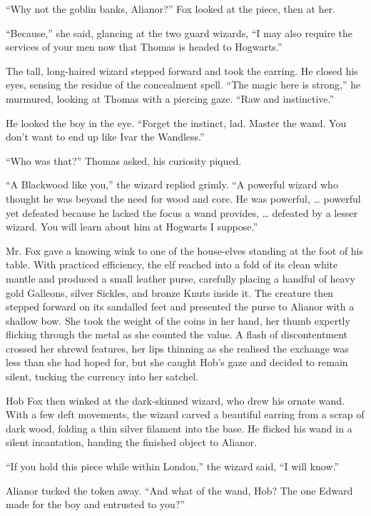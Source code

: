 \enquote{Why not the goblin banks, Alianor?} Fox looked at the piece, then at her.

\enquote{Because,} she said, glancing at the two guard wizards, \enquote{I may also require the services of your men now that Thomas is headed to Hogwarts.}

The tall, long-haired wizard stepped forward and took the earring. He closed his eyes, sensing the residue of the concealment spell. \enquote{The magic here is strong,} he murmured, looking at Thomas with a piercing gaze. \enquote{Raw and instinctive.}

He looked the boy in the eye. \enquote{Forget the instinct, lad. Master the wand. You don't want to end up like Ivar the Wandless.}

\enquote{Who was that?} Thomas asked, his curiosity piqued.

\enquote{A Blackwood like you,} the wizard replied grimly. \enquote{A powerful wizard who thought he was beyond the need for wood and core. He was powerful, \ldots{} powerful yet defeated because he lacked the focus a wand provides, \ldots{} defeated by a lesser wizard. You will learn about him at Hogwarts I suppose.}

Mr. Fox gave a knowing wink to one of the house-elves standing at the foot of his table. With practiced efficiency, the elf reached into a fold of its clean white mantle and produced a small leather purse, carefully placing a handful of heavy gold Galleons, silver Sickles, and bronze Knuts inside it. The creature then stepped forward on its sandalled feet and presented the purse to Alianor with a shallow bow. She took the weight of the coins in her hand, her thumb expertly flicking through the metal as she counted the value. A flash of discontentment crossed her shrewd features, her lips thinning as she realised the exchange was less than she had hoped for, but she caught Hob's gaze and decided to remain silent, tucking the currency into her satchel.

Hob Fox then winked at the dark-skinned wizard, who drew his ornate wand. With a few deft movements, the wizard carved a beautiful earring from a scrap of dark wood, folding a thin silver filament into the base. He flicked his wand in a silent incantation, handing the finished object to Alianor.

\enquote{If you hold this piece while within London,} the wizard said, \enquote{I will know.}

Alianor tucked the token away. \enquote{And what of the wand, Hob? The one Edward made for the boy and entrusted to you?}

